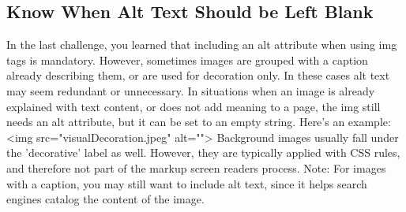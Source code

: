 \documentclass{article}%
\begin{document}
%
\subsection{Know When Alt Text Should be Left Blank}%
\label{subsec:KnowWhenAltTextShouldbeLeftBlank}%
In the last challenge, you learned that including an alt attribute when using img tags is mandatory. However, sometimes images are grouped with a caption already describing them, or are used for decoration only. In these cases alt text may seem redundant or unnecessary.\newline%
In situations when an image is already explained with text content, or does not add meaning to a page, the img still needs an alt attribute, but it can be set to an empty string. Here's an example:\newline%
<img src="visualDecoration.jpeg" alt="">\newline%
Background images usually fall under the 'decorative' label as well. However, they are typically applied with CSS rules, and therefore not part of the markup screen readers process.\newline%
Note: For images with a caption, you may still want to include alt text, since it helps search engines catalog the content of the image.\newline%

%
\end{document}
